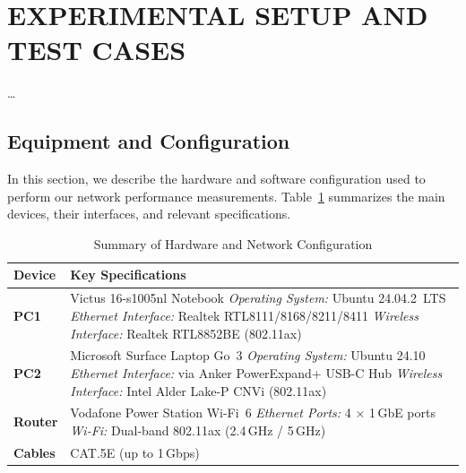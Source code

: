 
\section{EXPERIMENTAL SETUP AND TEST CASES} \label{sec:experimental-setup-and-test-cases}


    \ldots

    \subsection{Equipment and Configuration} \label{subsec:equipment-and-configuration}

        In this section, we describe the hardware and software configuration used to perform our network performance measurements. Table~\ref{tab:equipment-summary} summarizes the main devices, their interfaces, and relevant specifications. 

        \begin{table}[ht]
            \small
            \centering
            \caption{Summary of Hardware and Network Configuration}
            \label{tab:equipment-summary}
            \begin{tabular}{@{}l p{}@{}}
            \toprule
            \textbf{Device} & \textbf{Key Specifications} \\
            \midrule
            \textbf{PC1} 
                & Victus 16-s1005nl Notebook \newline
                  \textit{Operating System:} Ubuntu 24.04.2~LTS \newline
                  \textit{Ethernet Interface:} Realtek RTL8111/8168/8211/8411 \newline
                  \textit{Wireless Interface:} Realtek RTL8852BE (802.11ax) \\
            \midrule
            \textbf{PC2} 
                & Microsoft Surface Laptop Go~3 \newline
                  \textit{Operating System:} Ubuntu 24.10 \newline
                  \textit{Ethernet Interface:} via Anker PowerExpand+ USB-C Hub \newline
                  \textit{Wireless Interface:} Intel Alder Lake-P CNVi (802.11ax) \\
            \midrule
            \textbf{Router} 
                & Vodafone Power Station Wi-Fi~6 \newline
                  \textit{Ethernet Ports:} 4 $\times$ 1\,GbE ports \newline
                  \textit{Wi-Fi:} Dual-band 802.11ax (2.4\,GHz / 5\,GHz) \\
            \midrule
            \textbf{Cables} 
                & CAT.5E (up to 1\,Gbps) \\
            \bottomrule
            \end{tabular}
        \end{table}

